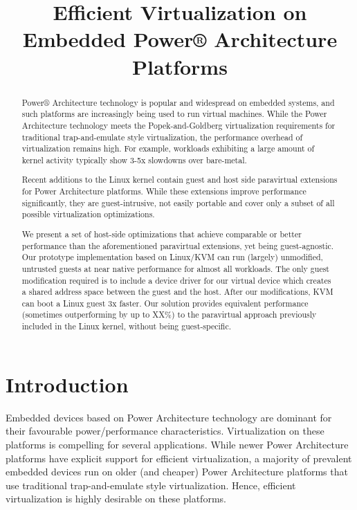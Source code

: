 \documentclass[10pt,twocolumn]{article}
\begin{document}
\title{Efficient Virtualization on Embedded Power® Architecture Platforms}
\author{}
\date{}
\maketitle
\thispagestyle{empty}

\maketitle
\begin{abstract}
  Power® Architecture technology is popular and widespread on embedded systems, and such
  platforms are
  increasingly
  being used to run virtual machines\cite{XXX}. While the Power Architecture technology meets the
  Popek-and-Goldberg virtualization requirements for traditional trap-and-emulate
  style virtualization, the performance overhead of virtualization remains high.
  For example, workloads exhibiting a large amount of kernel activity typically
  show 3-5x slowdowns over bare-metal.

  Recent additions to the Linux kernel contain guest and host side paravirtual
  extensions for Power Architecture platforms. While these extensions improve performance significantly, they
  are guest-intrusive, not easily portable and cover only a subset of all possible
  virtualization optimizations.

  We present a set of host-side optimizations that achieve comparable
  or better performance
  than the aforementioned paravirtual extensions, yet being guest-agnostic. Our
  prototype implementation based on Linux/KVM can run (largely) unmodified, untrusted
  guests at near native performance for almost all workloads. The only
  guest modification required is to include a device driver for our virtual
  device which creates a shared address space between the guest and the host.
  After our modifications, KVM can boot a Linux guest 3x faster. Our solution
  provides equivalent performance (sometimes outperforming by up to XX\%) to
  the paravirtual approach previously included in the Linux kernel, without
  being guest-specific.
\end{abstract}
\section{Introduction}
Embedded devices based on Power Architecture technology are dominant for their
favourable power/performance characteristics. Virtualization on these platforms is
compelling for several applications\cite{XXX}. While newer Power Architecture platforms
have explicit support for efficient virtualization\cite{XXX}, a majority of
prevalent embedded devices run on older (and cheaper) Power Architecture platforms that use
traditional trap-and-emulate style virtualization\cite{XXX}. Hence, efficient
virtualization is highly desirable on these platforms.
\end{document}
